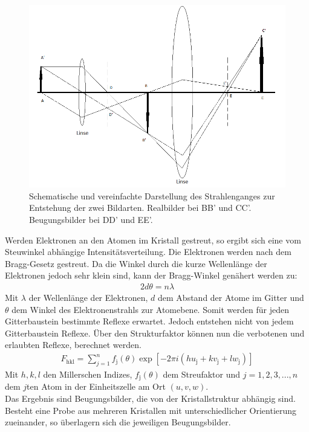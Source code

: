 \documentclass[a4paper,11pt,DIV=11]{scrartcl}
\begin{document}
\begin{figure}[H]
\center
\includegraphics[width=\textwidth]{Strahlengang.png}
\caption{Schematische und vereinfachte Darstellung des Strahlenganges zur Entstehung der zwei Bildarten. Realbilder bei BB' und CC'. Beugungsbilder bei DD' und EE'.}
\label{Strahlengang}
\end{figure}
Werden Elektronen an den Atomen im Kristall gestreut, so ergibt sich eine vom Steuwinkel abhängige Intensitätsverteilung. Die Elektronen werden nach dem Bragg-Gesetz gestreut. Da die Winkel durch die kurze Wellenlänge der Elektronen jedoch sehr klein sind, kann der Bragg-Winkel genähert werden zu:
\begin{align}
2d\theta = n\lambda
\end{align}
Mit \(\lambda\) der Wellenlänge der Elektronen, \(d\) dem Abstand der Atome im Gitter und \(\theta\) dem Winkel des Elektronenstrahls zur Atomebene. Somit werden für jeden Gitterbaustein bestimmte Reflexe erwartet. Jedoch entstehen nicht von jedem Gitterbaustein Reflexe. Über den Strukturfaktor können nun die verbotenen und erlaubten Reflexe, berechnet werden.
\begin{align}
F_\mathrm{hkl}= \sum_{j=1}^n f_\mathrm{j}(\theta)\exp[-2\pi i (hu_\mathrm{j}+kv_\mathrm{j}+lw_\mathrm{j})]
\end{align}
Mit \(h,k,l\) den Millerschen Indizes, \(f_\mathrm{j}(\theta)\) dem Streufaktor und \(j=1,2,3,...,n\) dem \(j\)ten Atom in der Einheitszelle am Ort \((u,v,w)\).\\
Das Ergebnis sind Beugungsbilder, die von der Kristallstruktur abhängig sind. Besteht eine Probe aus mehreren Kristallen mit unterschiedlicher Orientierung zueinander, so überlagern sich die jeweiligen Beugungsbilder.
\end{document}
